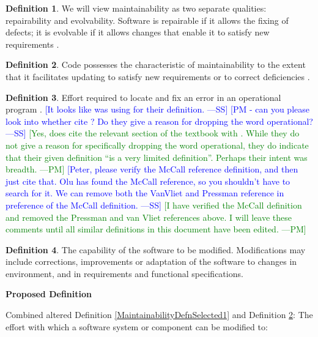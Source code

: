 \documentclass[letterpaper,cleveref]{lipics-v2019}
\newcommand{\authornote}[3]{\textcolor{#1}{[#3 ---#2]}}
\newcommand{\authornote}[3]{}
\newcommand{\wss}[1]{\authornote{blue}{SS}{#1}} %
\newcommand{\pmi}[1]{\authornote{green}{PM}{#1}} %
\theoremstyle{definition}
\newtheorem{defn}{Definition}
\begin{document}
\begin{defn}
  We will view maintainability as two separate qualities: repairability and
  evolvability. Software is repairable if it allows the fixing of defects; it is
  evolvable if it allows changes that enable it to satisfy new requirements
  \citep{ghezzi1991fundamentals}.
\end{defn}

\begin{defn} \label{MaintainabilityDefnSelected2} 
  Code possesses the characteristic of maintainability to the extent that it
  facilitates updating to satisfy new requirements or to correct deficiencies
  \citep{boehm2007software}.
\end{defn}

\begin{defn}
  Effort required to locate and fix an error in an operational program
  \citep{McCallEtAl1977}. \wss{It looks
    like \citet{pressman2005software} was using \citet{McCallEtAl1977} for their
    definition.} \wss{PM - can you please look into whether
    \citet{pressman2005software} cite \citet{McCallEtAl1977}?  Do they give a
    reason for dropping the word operational?}  \pmi{Yes,
    \citet{pressman2005software} does cite the relevant section of the textbook
    with \citet{McCallEtAl1977}. While they do not give a reason for
    specifically dropping the word operational, they do indicate that their
    given definition ``is a very limited definition''. Perhaps their intent was
    breadth.} \wss{Peter, please verify the McCall reference definition, and
    then just cite that.  Olu has found the McCall reference, so you shouldn't
    have to search for it.  We can remove both the VanVliet and Pressman
    reference in  preference of the McCall definition.}
\pmi{I have verified the McCall definition and removed the Pressman and van Vliet references above. I will leave these comments until all similar definitions in this document have been edited.}
\end{defn}

\begin{defn}
  The capability of the software to be modified.  Modifications may include
  corrections, improvements or adaptation of the software to changes in
  environment, and in requirements and functional specifications. \cite{ISO9126}
\end{defn}

\noindent \textbf{Proposed Definition}

Combined altered Definition \ref{MaintainabilityDefnSelected1} and Definition
\ref{MaintainabilityDefnSelected2}: The effort with which a software system or
component can be modified to:
\end{document}

